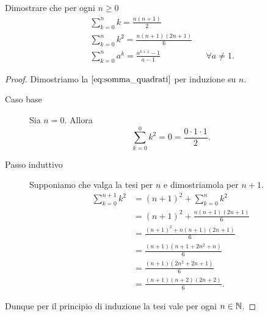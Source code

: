 \begin{example}
    Dimostrare che per ogni $n \geq 0$ \begin{align}
        &\sum_{k=0}^n k = \frac{n(n+1)}{2} \label{eq:somma_lineare}\\
        &\sum_{k=0}^n k^2 = \frac{n(n+1)(2n+1)}{6} \label{eq:somma_quadrati}\\
        &\sum_{k=0}^n a^k = \frac{a^{k+1}-1}{a-1} &&\forall a \neq 1. \label{eq:somma_geometrica}
    \end{align}
\end{example}
\begin{proof}
    Dimostriamo la $\ref{eq:somma_quadrati}$ per induzione su $n$.
    \begin{description}
        \item[Caso base] Sia $n = 0$. Allora \[
            \sum_{k=0}^0 k^2 = 0 = \frac{0 \cdot 1 \cdot 1}{2}.  
        \]
        \item[Passo induttivo] Supponiamo che valga la tesi per $n$ e dimostriamola per $n+1$.
        \begin{align*}
            \sum_{k=0}^{n+1} k^2 &= (n+1)^2 + \sum_{k=0}^n k^2 \\
            &= (n+1)^2 + \frac{n(n+1)(2n+1)}{6}\\
            &= \frac{(n+1)^2 + n(n+1)(2n+1)}{6}\\
            &= \frac{(n+1)(n+1 + 2n^2 + n)}{6}\\
            &= \frac{(n+1)(2n^2 + 2n + 1)}{6}\\
            &= \frac{(n+1)(n+2)(2n+2)}{6}.
        \end{align*} 
    \end{description}
    Dunque per il principio di induzione la tesi vale per ogni $n \in \mathbb{N}$.
\end{proof}


